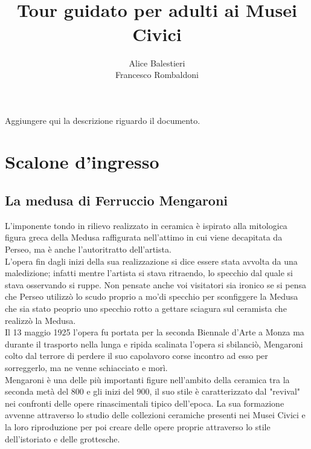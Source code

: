 \documentclass[hidelinks,12pt,a4paper]{article}
\begin{document}
	\begin{flushleft}
	
			\title{\textbf{\\Tour guidato per adulti ai Musei Civici}}
			\author{Alice Balestieri\\Francesco Rombaldoni}
			\date{}
	
			\maketitle
			
			\setcounter{page}{1}
			\newpage
			\vspace*{\fill}
			Aggiungere qui la descrizione riguardo il documento. 
			\vspace*{\fill}
			\newpage
			\tableofcontents
			\newpage
	
			\section{Scalone d'ingresso}
	
			\subsection{La medusa di Ferruccio Mengaroni}
			L'imponente tondo in rilievo realizzato in ceramica è ispirato alla mitologica figura greca della Medusa raffigurata nell'attimo in cui viene decapitata da Perseo, ma è anche l’autoritratto dell'artista.\\
			L'opera fin dagli inizi della sua realizzazione si dice essere stata avvolta da una maledizione; infatti mentre l'artista si stava ritraendo, lo specchio dal quale si stava osservando si ruppe. Non pensate anche voi visitatori sia ironico se si pensa che Perseo utilizzò lo scudo proprio a mo'di specchio per sconfiggere la Medusa che sia stato peoprio uno specchio rotto a gettare sciagura sul ceramista che realizzò la Medusa.\\
			Il 13 maggio 1925 l'opera fu portata per la seconda Biennale d'Arte a Monza ma durante il trasporto nella lunga e ripida scalinata l'opera si sbilanciò, Mengaroni colto dal terrore di perdere il suo capolavoro corse incontro ad esso per sorreggerlo, ma ne venne schiacciato e morì.\\
			Mengaroni è una delle più importanti figure nell'ambito della ceramica tra la seconda metà del 800 e gli inizi del 900, il suo stile è caratterizzato dal "revival" nei confronti delle opere rinascimentali tipico dell'epoca. La sua formazione avvenne attraverso lo studio delle collezioni ceramiche presenti nei Musei Civici e la loro riproduzione per poi creare delle opere proprie attraverso lo stile dell'istoriato e delle grottesche.
	

\end{flushleft}
\end{document}
